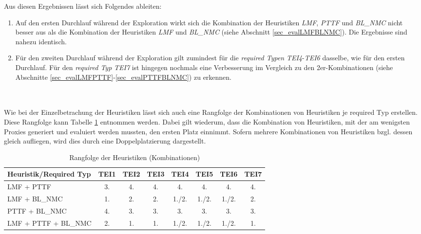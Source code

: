 \begin{multicols}{2}
\columnbreak
{}
\end{multicols}
\noindent
Aus diesen Ergebnissen lässt sich Folgendes ableiten:
\begin{enumerate}
\item Auf den ersten Durchlauf während der Exploration wirkt sich die Kombination der Heuristiken \emph{LMF}, \emph{PTTF} und \emph{BL\_NMC} nicht besser aus als die Kombination der Heuristiken \emph{LMF} und \emph{BL\_NMC} (siehe Abschnitt \ref{sec_evalLMFBLNMC}). Die Ergebnisse sind nahezu identisch.
\item Für den zweiten Durchlauf während der Exploration gilt zumindest für die \emph{required Typen} \emph{TEI4}-\emph{TEI6} dasselbe, wie für den ersten Durchlauf. Für den \emph{required Typ} \emph{TEI7} ist hingegen nochmals eine Verbesserung im Vergleich zu den 2er-Kombinationen (siehe Abschnitte \ref{sec_evalLMFPTTF}-\ref{sec_evalPTTFBLNMC}) zu erkennen.
\end{enumerate}
\noindent
\\\\
Wie bei der Einzelbetrachung der Heuristiken lässt sich auch eine Rangfolge der Kombinationen von Heuristiken je required Typ erstellen. Diese Rangfolge kann Tabelle \ref{tab_rankingCombi} entnommen werden. Dabei gilt wiederum, dass die Kombination von Heuristiken, mit der am wenigsten Proxies generiert und evaluiert werden mussten, den ersten Platz einnimmt. Sofern mehrere Kombinationen von Heuristiken bzgl. dessen gleich aufliegen, wird dies durch eine Doppelplatzierung dargestellt.
\begin{table}[!h]
\centering
\begin{tabular}{|l|c|c|c|c|c|c|c|}
\hline
\hline
\textbf{Heuristik/Required Typ} & \textbf{TEI1} & \textbf{TEI2}& \textbf{TEI3}& \textbf{TEI4}& \textbf{TEI5}& \textbf{TEI6}& \textbf{TEI7}\\
\hline
\hline
LMF + PTTF &3.&4.&4.&4.&4.&4.&4.\\
\hline
LMF + BL\_NMC &1. &2.&2.&1./2.&1./2.&1./2.&2. \\
\hline
PTTF + BL\_NMC &4. &3.&3.&3.&3.&3.& 3.\\
\hline
LMF + PTTF + BL\_NMC &2. &1. &1. & 1./2.&1./2.&1./2.&1.\\
\hline
\hline
\end{tabular}
\caption{Rangfolge der Heuristiken (Kombinationen)}
\label{tab_rankingCombi}
\end{table}
